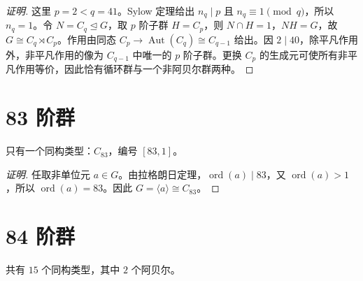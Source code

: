 \documentclass[UTF8,fontset=fandol,11pt,a4paper]{ctexart}
\newcommand{\Aut}{\operatorname{Aut}}\newcommand{\GL}{\operatorname{GL}}\newcommand{\ord}{\operatorname{ord}}\newcommand{\Z}{\mathrm Z}
\begin{document}
\begin{proof}[证明]
这里 $p=2<q=41$。Sylow 定理给出 $n_q\mid p$ 且 $n_q\equiv1\pmod q$，所以 $n_q=1$。令 $N=C_q\trianglelefteq G$，取 $p$ 阶子群 $H=C_p$，则 $N\cap H=1$，$NH=G$，故 $G\cong C_q\rtimes C_p$。作用由同态 $C_p\to\Aut(C_q)\cong C_{q-1}$ 给出。因 $2\mid 40$，除平凡作用外，非平凡作用的像为 $C_{q-1}$ 中唯一的 $p$ 阶子群。更换 $C_p$ 的生成元可使所有非平凡作用等价，因此恰有循环群与一个非阿贝尔群两种。
\end{proof}

\section*{83 阶群}\label{order:83}

只有一个同构类型：$C_{83}$，编号 $[83,1]$。

\begin{proof}[证明]
任取非单位元 $a\in G$。由拉格朗日定理，$\ord(a)\mid 83$，又 $\ord(a)>1$，所以 $\ord(a)=83$。因此 $G=\langle a\rangle\cong C_{83}$。
\end{proof}

\section*{84 阶群}\label{order:84}

共有 $15$ 个同构类型，其中 $2$ 个阿贝尔。

\begingroup\small\setlength{\tabcolsep}{3pt}\renewcommand{\arraystretch}{1.12}
\end{document}
